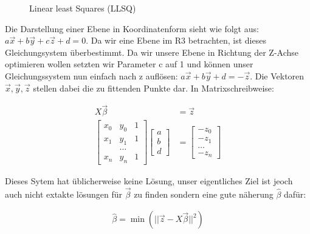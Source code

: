 \documentclass[11pt,oneside,openright]{mpreport}
\begin{document}
\begin{figure}[!ht]
\caption{Linear least Squares (LLSQ)  \cite{LLSQ}}

\label{LLSQ_MIN}
\end{figure}

Die Darstellung einer Ebene in Koordinatenform sieht wie folgt aus: $ a\vec{x} + b\vec{y} + c\vec{z} + d = 0 $. Da wir eine Ebene im R3 betrachten, ist dieses Gleichungsystem überbestimmt.
Da wir unsere Ebene in Richtung der Z-Achse optimieren wollen setzten wir Parameter c auf 1 und können unser Gleichungssystem nun einfach nach z auflösen: $a\vec{x} + b\vec{y} + d = -\vec{z}$.
Die Vektoren $\vec{x},\vec{y},\vec{z}$ stellen dabei die zu fittenden Punkte dar.
In Matrixschreibweise:

\begin{align*}
X \vec{\beta} &= \vec{z}\\
\begin{bmatrix}
x_0 & y_0 & 1 \\
x_1 & y_1 & 1 \\
 & \dots & \\
x_n & y_n & 1 
\end{bmatrix} 
\begin{bmatrix}
a \\
b \\
d 
\end{bmatrix}
&= 
\begin{bmatrix}
-z_0 \\
-z_1 \\
\dots \\
-z_n 
\end{bmatrix} 
\end{align*}

Dieses Sytem hat üblicherweise keine Lösung, unser eigentliches Ziel ist jeoch auch nicht extakte lösungen für $\vec\beta$ zu finden sondern eine gute näherung $\hat{\beta}$ dafür:

\begin{align*}
\hat{\beta} = \min{(|| \vec{z} - X\vec{\beta} ||^2)}
\end{align*}
\end{document}

